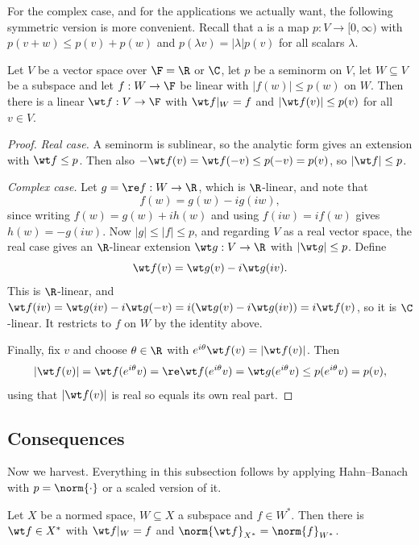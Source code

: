 For the complex case, and for the applications we actually want, the following symmetric version is more convenient. Recall that a  is a map $p : V \to [0,\infty)$ with $p(v+w) \leq p(v) + p(w)$ and $p(\lambda v) = |\lambda| p(v)$ for all scalars $\lambda$.

\begin{theorem}
	Let $V$ be a vector space over $\F = \R$ or $\C$, let $p$ be a seminorm on $V$, let $W \subseteq V$ be a subspace and let $f : W \to \F$ be linear with $|f(w)| \leq p(w)$ on $W$. Then there is a linear $\wt f : V \to \F$ with $\wt f|_W = f$ and $|\wt f(v)| \leq p(v)$ for all $v \in V$.
\end{theorem}

\begin{proof}
	\emph{Real case.} A seminorm is sublinear, so the analytic form gives an extension with $\wt f \leq p$. Then also $-\wt f(v) = \wt f(-v) \leq p(-v) = p(v)$, so $|\wt f| \leq p$.

	\emph{Complex case.} Let $g = \re f : W \to \R$, which is $\R$-linear, and note that
	$$f(w) = g(w) - i g(iw),$$
	since writing $f(w) = g(w) + ih(w)$ and using $f(iw) = if(w)$ gives $h(w) = -g(iw)$. Now $|g| \leq |f| \leq p$, and regarding $V$ as a real vector space, the real case gives an $\R$-linear extension $\wt g : V \to \R$ with $|\wt g| \leq p$. Define
	$$\wt f(v) = \wt g(v) - i \wt g(iv).$$
	This is $\R$-linear, and $\wt f(iv) = \wt g(iv) - i\wt g(-v) = i(\wt g(v) - i \wt g(iv)) = i \wt f(v)$, so it is $\C$-linear. It restricts to $f$ on $W$ by the identity above.

	Finally, fix $v$ and choose $\theta \in \R$ with $e^{i\theta} \wt f(v) = |\wt f(v)|$. Then
	$$|\wt f(v)| = \wt f(e^{i\theta} v) = \re \wt f(e^{i\theta}v) = \wt g(e^{i\theta} v) \leq p(e^{i\theta}v) = p(v),$$
	using that $|\wt f(v)|$ is real so equals its own real part.
\end{proof}

\subsection{Consequences}

Now we harvest. Everything in this subsection follows by applying Hahn--Banach with $p = \norm{\cdot}$ or a scaled version of it.

\begin{corollary}
	Let $X$ be a normed space, $W \subseteq X$ a subspace and $f \in W^*$. Then there is $\wt f \in X^*$ with $\wt f|_W = f$ and $\norm{\wt f}_{X^*} = \norm{f}_{W^*}$.
\end{corollary}

